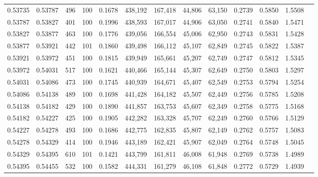 \begin{tabular}{rrrrrrrrrrrrr}
0.53735 & 0.53787 &   496 & 100 &                                     0.1678 & 438,192 & 167,418 &  44,806 &  63,150 & 0.2739 & 0.5850 & 1.5508 \\
0.53787 & 0.53827 &   401 & 100 &                                     0.1996 & 438,593 & 167,017 &  44,906 &  63,050 & 0.2741 & 0.5840 & 1.5471 \\
0.53827 & 0.53877 &   463 & 100 &                                     0.1776 & 439,056 & 166,554 &  45,006 &  62,950 & 0.2743 & 0.5831 & 1.5428 \\
0.53877 & 0.53921 &   442 & 101 &                                     0.1860 & 439,498 & 166,112 &  45,107 &  62,849 & 0.2745 & 0.5822 & 1.5387 \\
0.53921 & 0.53972 &   451 & 100 &                                     0.1815 & 439,949 & 165,661 &  45,207 &  62,749 & 0.2747 & 0.5812 & 1.5345 \\
0.53972 & 0.54031 &   517 & 100 &                                     0.1621 & 440,466 & 165,144 &  45,307 &  62,649 & 0.2750 & 0.5803 & 1.5297 \\
0.54031 & 0.54086 &   473 & 100 &                                     0.1745 & 440,939 & 164,671 &  45,407 &  62,549 & 0.2753 & 0.5794 & 1.5254 \\
0.54086 & 0.54138 &   489 & 100 &                                     0.1698 & 441,428 & 164,182 &  45,507 &  62,449 & 0.2756 & 0.5785 & 1.5208 \\
0.54138 & 0.54182 &   429 & 100 &                                     0.1890 & 441,857 & 163,753 &  45,607 &  62,349 & 0.2758 & 0.5775 & 1.5168 \\
0.54182 & 0.54227 &   425 & 100 &                                     0.1905 & 442,282 & 163,328 &  45,707 &  62,249 & 0.2760 & 0.5766 & 1.5129 \\
0.54227 & 0.54278 &   493 & 100 &                                     0.1686 & 442,775 & 162,835 &  45,807 &  62,149 & 0.2762 & 0.5757 & 1.5083 \\
0.54278 & 0.54329 &   414 & 100 &                                     0.1946 & 443,189 & 162,421 &  45,907 &  62,049 & 0.2764 & 0.5748 & 1.5045 \\
0.54329 & 0.54395 &   610 & 101 &                                     0.1421 & 443,799 & 161,811 &  46,008 &  61,948 & 0.2769 & 0.5738 & 1.4989 \\
0.54395 & 0.54455 &   532 & 100 &                                     0.1582 & 444,331 & 161,279 &  46,108 &  61,848 & 0.2772 & 0.5729 & 1.4939 \\

\end{tabular}
